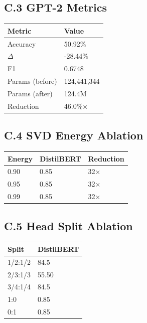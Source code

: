 \subsection{C.3 GPT-2 Metrics}

\begin{table}[H]
\centering
\small
\begin{tabular}{ll}
\toprule
\textbf{Metric} & \textbf{Value} \\
\midrule
Accuracy & 50.92\% \\
$\Delta$ & -28.44\% \\
F1 & 0.6748 \\
Params (before) & 124,441,344 \\
Params (after) & 124.4M \\
Reduction & 46.0\%$\times$ \\
\bottomrule
\end{tabular}
\end{table}

\subsection{C.4 SVD Energy Ablation}

\begin{table}[H]
\centering
\small
\begin{tabular}{lll}
\toprule
\textbf{Energy} & \textbf{DistilBERT} & \textbf{Reduction} \\
\midrule
0.90 & 0.85 & 32$\times$ \\
0.95 & 0.85 & 32$\times$ \\
0.99 & 0.85 & 32$\times$ \\
\bottomrule
\end{tabular}
\end{table}

\subsection{C.5 Head Split Ablation}

\begin{table}[H]
\centering
\small
\begin{tabular}{ll}
\toprule
\textbf{Split} & \textbf{DistilBERT} \\
\midrule
1/2:1/2 & 84.5 \\
2/3:1/3 & 55.50 \\
3/4:1/4 & 84.5 \\
1:0 & 0.85 \\
0:1 & 0.85 \\
\bottomrule
\end{tabular}
\end{table}

